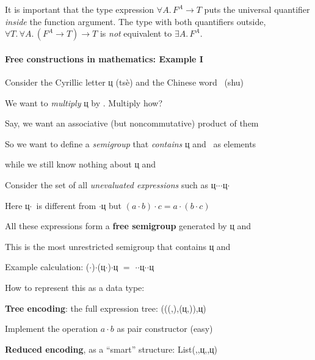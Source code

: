 It is important that the type expression $\forall A.\,F^{A}\rightarrow T$
puts the universal quantifier \emph{inside} the function argument.
The type with both quantifiers outside, $\forall T.\,\forall A.\,(F^{A}\rightarrow T)\rightarrow T$
is \emph{not} equivalent to $\exists A.\,F^{A}$.

\paragraph{Free constructions in mathematics: Example I}

Consider the Cyrillic letter \foreignlanguage{russian}{ц} (ts\`{e})
and the Chinese word \shui~(shu)

We want to \emph{multiply} \foreignlanguage{russian}{ц} by \shui.
Multiply how?

Say, we want an associative (but noncommutative) product of them

So we want to define a \emph{semigroup} that \emph{contains} \foreignlanguage{russian}{ц}
and \shui~as elements

while we still know nothing about \foreignlanguage{russian}{ц} and
\shui

Consider the set of all \emph{unevaluated expressions} such as \foreignlanguage{russian}{ц}$\cdot$\shui$\cdot$\shui$\cdot$\foreignlanguage{russian}{ц}$\cdot$\shui

Here \foreignlanguage{russian}{ц}$\cdot$\shui~is different from
\shui$\cdot$\foreignlanguage{russian}{ц} but $\left(a\cdot b\right)\cdot c=a\cdot\left(b\cdot c\right)$

All these expressions form a \textbf{free semigroup} generated by
\foreignlanguage{russian}{ц} and \shui

This is the most unrestricted semigroup that contains \foreignlanguage{russian}{ц}
and \shui

Example calculation: (\shui$\cdot$\shui)$\cdot$(\foreignlanguage{russian}{ц}$\cdot$\shui)$\cdot$\foreignlanguage{russian}{ц}
$=$ \shui$\cdot$\shui$\cdot$\foreignlanguage{russian}{ц}$\cdot$\shui$\cdot$\foreignlanguage{russian}{ц}

How to represent this as a data type:

\textbf{Tree encoding}: the full expression tree: (((\shui,\shui),(\foreignlanguage{russian}{ц},\shui)),\foreignlanguage{russian}{ц})

Implement the operation $a\cdot b$ as pair constructor (easy)

\textbf{Reduced encoding}, as a \textsf{``}smart\textsf{''} structure: List(\shui,\shui,\foreignlanguage{russian}{ц},\shui,\foreignlanguage{russian}{ц})

